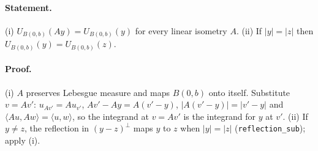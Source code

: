 \paragraph{Statement.} (i) $U_{B(0,b)}(Ay)=U_{B(0,b)}(y)$ for every linear isometry $A$. (ii) If $|y|=|z|$ then
$U_{B(0,b)}(y)=U_{B(0,b)}(z)$.
\paragraph{Proof.} (i) $A$ preserves Lebesgue measure and maps $B(0,b)$ onto itself. Substitute $v=Av'$:
$u_{Av'}=Au_{v'}$, $Av'-Ay=A(v'-y)$, $|A(v'-y)|=|v'-y|$ and $\langle Au,Aw\rangle=\langle u,w\rangle$, so the
integrand at $v=Av'$ is the integrand for $y$ at $v'$. (ii) If $y\neq z$, the reflection in $(y-z)^\perp$
maps $y$ to $z$ when $|y|=|z|$ (\texttt{reflection\_sub}); apply (i).
